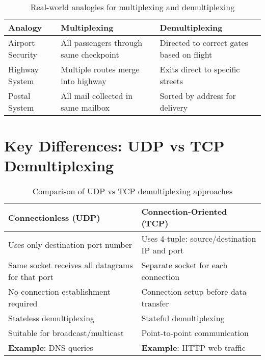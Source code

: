 \documentclass[12pt]{article}
\begin{document}
\begin{table}[h]
    \centering
    \begin{tabular}{p{}p{}p{}}
        \toprule
        \textbf{Analogy} & \textbf{Multiplexing}                  & \textbf{Demultiplexing}                   \\
        \midrule
        Airport Security & All passengers through same checkpoint & Directed to correct gates based on flight \\
        Highway System   & Multiple routes merge into highway     & Exits direct to specific streets          \\
        Postal System    & All mail collected in same mailbox     & Sorted by address for delivery            \\
        \bottomrule
    \end{tabular}
    \caption{Real-world analogies for multiplexing and demultiplexing}
    \label{tab:analogies}
\end{table}

\section{Key Differences: UDP vs TCP Demultiplexing}

\begin{table}[h]
    \centering
    \begin{tabular}{p{}p{}}
        \toprule
        \textbf{Connectionless (UDP)}                    & \textbf{Connection-Oriented (TCP)}           \\
        \midrule
        Uses only destination port number                & Uses 4-tuple: source/destination IP and port \\
        Same socket receives all datagrams for that port & Separate socket for each connection          \\
        No connection establishment required             & Connection setup before data transfer        \\
        Stateless demultiplexing                         & Stateful demultiplexing                      \\
        Suitable for broadcast/multicast                 & Point-to-point communication                 \\
        \textbf{Example}: DNS queries                    & \textbf{Example}: HTTP web traffic           \\
        \bottomrule
    \end{tabular}
    \caption{Comparison of UDP vs TCP demultiplexing approaches}
    \label{tab:udp_vs_tcp_demux}
\end{table}
\end{document}
